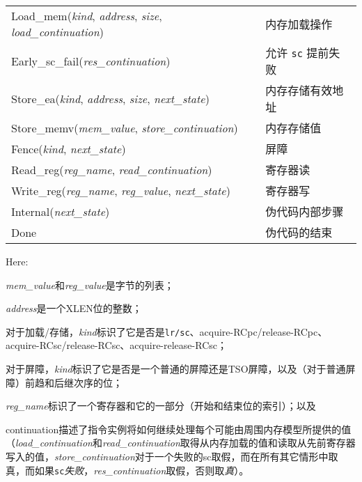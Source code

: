 \begin{center}
\begin{tabular}{l@{ \quad-\quad }l}
{\sc Load\_mem}({\it kind}, {\it address}, {\it size}, {\it load\_continuation})
    & 内存加载操作  \\
{\sc Early\_sc\_fail}({\it res\_continuation})
    & 允许 {\tt sc} 提前失败 \\
{\sc Store\_ea}({\it kind}, {\it address}, {\it size}, {\it next\_state})
    & 内存存储有效地址  \\
{\sc Store\_memv}({\it mem\_value}, {\it store\_continuation})
    & 内存存储值 \\
{\sc Fence}({\it kind}, {\it next\_state})
    & 屏障  \\
{\sc Read\_reg}({\it reg\_name}, {\it read\_continuation})
    & 寄存器读  \\
{\sc Write\_reg}({\it reg\_name}, {\it reg\_value}, {\it next\_state})
    & 寄存器写  \\
{\sc Internal}({\it next\_state})
    & 伪代码内部步骤  \\
{\sc Done}
    & 伪代码的结束  \\
\end{tabular}
\end{center}
Here:
\begin{tightlist}
\item {\it mem\_value}和{\it reg\_value}是字节的列表；  %
\item {\it address}是一个XLEN位的整数；   %
\item 对于加载/存储，{\it kind}标识了它是否是{\tt lr/sc}、acquire-RCpc/release-RCpc、acquire-RCsc/release-RCsc、acquire-release-RCsc；  
\item 对于屏障，{\it kind}标识了它是否是一个普通的屏障还是TSO屏障，以及（对于普通屏障）前趋和后继次序的位；
\item {\it reg\_name}标识了一个寄存器和它的一部分（开始和结束位的索引）；以及
\item continuation描述了指令实例将如何继续处理每个可能由周围内存模型所提供的值（{\it load\_continuation}和{\it read\_continuation}取得从内存加载的值和读取从先前寄存器写入的值，{\it store\_continuation}对于一个失败的sc取假，而在所有其它情形中取真，而如果{\tt sc}{\it 失败}，{\it res\_continuation}取假，否则取{\it 真}）。
\end{tightlist}

